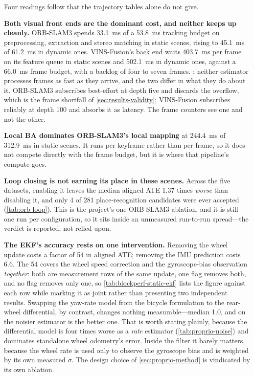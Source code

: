Four readings follow that the trajectory tables alone do not give.

\textbf{Both visual front ends are the dominant cost, and neither keeps up
cleanly.} ORB-SLAM3 spends \SI{33.1}{\milli\second} of a \SI{53.8}{\milli\second}
tracking budget on preprocessing, extraction and stereo matching in static scenes,
rising to \SI{45.1}{\milli\second} of \SI{61.2}{\milli\second} in dynamic ones.
VINS-Fusion's back end waits \SI{403.7}{\milli\second} per frame on its feature
queue in static scenes and \SI{502.1}{\milli\second} in dynamic ones, against a
\SI{66.0}{\milli\second} frame budget, with a backlog of four to seven frames.
: neither estimator
processes frames as fast as they arrive, and the two differ in what they do about
it. ORB-SLAM3 subscribes best-effort at depth five and discards the overflow,
which is the frame shortfall of \cref{sec:results-validity}; VINS-Fusion
subscribes reliably at depth 100 and absorbs it as latency. The frame counters see
one and not the other.

\textbf{Local BA dominates ORB-SLAM3's local mapping} at \SI{244.4}{\milli\second}
of \SI{312.9}{\milli\second} in static scenes. It runs per keyframe rather than
per frame, so it does not compete directly with the frame budget, but it is where
that pipeline's compute goes.

\textbf{Loop closing is not earning its place in these scenes.} Across the five
 datasets, enabling it leaves the median aligned ATE
\num{1.37} times \emph{worse} than disabling it, and only 4 of 281 place-recognition
candidates were ever accepted (\cref{tab:orb-loop}). This is the project's one
ORB-SLAM3 ablation, and it is still one run per configuration, so it sits inside
an unmeasured run-to-run spread---the verdict is reported, not relied upon.

\textbf{The EKF's accuracy rests on one intervention.} Removing the wheel update
costs a factor of \num{54} in aligned ATE; removing the IMU prediction costs
\num{6.6}. The \num{54} covers the wheel speed correction and the gyroscope-bias
observation \emph{together}: both are measurement rows of the same update, one
flag removes both, and no flag removes only one, so
\cref{tab:blockperf-static-ekf} lists the figure against each row while marking it
as joint rather than presenting two independent results. Swapping the yaw-rate model from the bicycle formulation to the
rear-wheel differential, by contrast, changes nothing measurable---median
\num{1.0}, and on  the noisier estimator is the better one.
That is worth stating plainly, because the differential model is four times worse
as a \emph{rate} estimator (\cref{tab:proprio-noise}) and dominates standalone
wheel odometry's error. Inside the filter it barely matters, because the wheel
rate is used only to observe the gyroscope bias and is weighted by its own
measured $\sigma$. The design choice of \cref{sec:proprio-method} is vindicated by
its own ablation.

